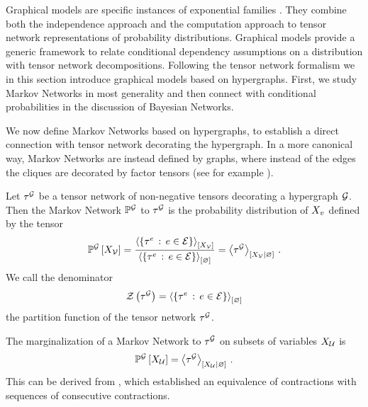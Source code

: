 Graphical models are specific instances of exponential families \cite{wainwright_graphical_2008, murphy_probabilistic_2022}.
They combine both the independence approach and the computation approach to tensor network representations of probability distributions.
Graphical models provide a generic framework to relate conditional dependency assumptions on a distribution with tensor network decompositions.
Following the tensor network formalism we in this section introduce graphical models based on hypergraphs.
First, we study Markov Networks in most generality and then connect with conditional probabilities in the discussion of Bayesian Networks.


We now define Markov Networks based on hypergraphs, to establish a direct connection with tensor network decorating the hypergraph.
In a more canonical way, Markov Networks are instead defined by graphs, where instead of the edges the cliques are decorated by factor tensors (see for example \cite{koller_probabilistic_2009}).

\begin{definition}
    \label{def:markovNetwork}
    Let $\tau^{\mathcal{G}}$ be a tensor network of non-negative tensors decorating a hypergraph $\mathcal{G}$.
    Then the Markov Network $\mathbb{P}^{\mathcal{G}}$ to $\tau^{\mathcal{G}}$ is the probability distribution of $X_{v}$ defined by the tensor
    \begin{align*}
        \mathbb{P}^{\mathcal{G}}\left[X_{\mathcal{V}}\right] = \frac{
            \left\langle \{\tau^{e} \,:\, e\in\mathcal{E}\}\right\rangle_{\left[ X_{\mathcal{V}} \right]}
        }{
            \left\langle \{\tau^{e} \,:\, e\in\mathcal{E}\}\right\rangle_{\left[ \varnothing \right]}
        } = \left\langle \tau^{\mathcal{G}}\right\rangle_{\left[ X_{\mathcal{V}} | \varnothing \right]} \, .
    \end{align*}
    We call the denominator
    \begin{align*}
        \mathcal{Z}\left(\tau^{\mathcal{G}}\right) = \left\langle \{\tau^{e} \,:\, e\in\mathcal{E}\}\right\rangle_{\left[ \varnothing \right]}
    \end{align*}
    the partition function of the tensor network $\tau^{\mathcal{G}}$.
\end{definition}

The marginalization of a Markov Network to $\tau^{\mathcal{G}}$ on subsets of variables $X_{\mathcal{U}}$ is
\begin{align*}
    \mathbb{P}^{\mathcal{G}}\left[X_{\mathcal{U}}\right]
    = \left\langle \tau^{\mathcal{G}}\right\rangle_{\left[ X_{\mathcal{U}} | \varnothing \right]} \, .
\end{align*}
This can be derived from , which established an equivalence of contractions with sequences of consecutive contractions.

